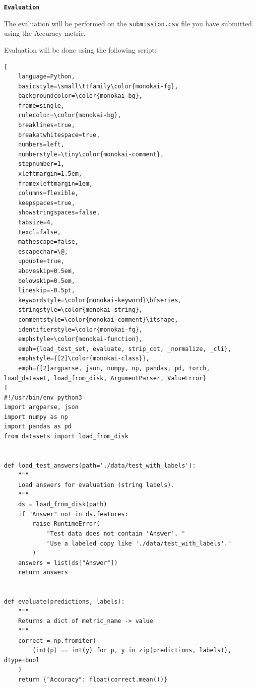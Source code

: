 \documentclass{fairmeta}
\begin{document}
\begin{tcolorbox}[
  colback=md-bg,
  colframe=md-bg,
  boxrule=0pt,
  left=10pt,
  right=10pt,
  top=10pt,
  bottom=10pt,
  sharp corners,
  enhanced
]
{\vspace{0.6em}

{\large\bfseries\color{md-heading}\texttt{Evaluation}}
\vspace{0.2em}

The evaluation will be performed on the \colorbox{md-code-bg}{\texttt{\color{md-code}submission.csv}} file you have submitted using the Accuracy metric.

Evaluation will be done using the following script:
}
\end{tcolorbox}


\vspace{0.3em}
\begin{lstlisting}[
    language=Python,
    basicstyle=\small\ttfamily\color{monokai-fg},
    backgroundcolor=\color{monokai-bg},
    frame=single,
    rulecolor=\color{monokai-bg},
    breaklines=true,
    breakatwhitespace=true,
    numbers=left,
    numberstyle=\tiny\color{monokai-comment},
    stepnumber=1,
    xleftmargin=1.5em,
    framexleftmargin=1em,
    columns=flexible,
    keepspaces=true,
    showstringspaces=false,
    tabsize=4,
    texcl=false,
    mathescape=false,
    escapechar=\@,
    upquote=true,
    aboveskip=0.5em,
    belowskip=0.5em,
    lineskip=-0.5pt,
    keywordstyle=\color{monokai-keyword}\bfseries,
    stringstyle=\color{monokai-string},
    commentstyle=\color{monokai-comment}\itshape,
    identifierstyle=\color{monokai-fg},
    emphstyle=\color{monokai-function},
    emph={load_test_set, evaluate, strip_cot, _normalize, _cli},
    emphstyle={[2]\color{monokai-class}},
    emph={[2]argparse, json, numpy, np, pandas, pd, torch, load_dataset, load_from_disk, ArgumentParser, ValueError}
]
#!/usr/bin/env python3
import argparse, json
import numpy as np
import pandas as pd
from datasets import load_from_disk


def load_test_answers(path='./data/test_with_labels'):
    """
    Load answers for evaluation (string labels).
    """
    ds = load_from_disk(path)
    if "Answer" not in ds.features:
        raise RuntimeError(
            "Test data does not contain 'Answer'. "
            "Use a labeled copy like './data/test_with_labels'."
        )
    answers = list(ds["Answer"])
    return answers


def evaluate(predictions, labels):
    """
    Returns a dict of metric_name -> value
    """
    correct = np.fromiter(
        (int(p) == int(y) for p, y in zip(predictions, labels)), dtype=bool
    )
    return {"Accuracy": float(correct.mean())}



\end{lstlisting}
\end{document}

